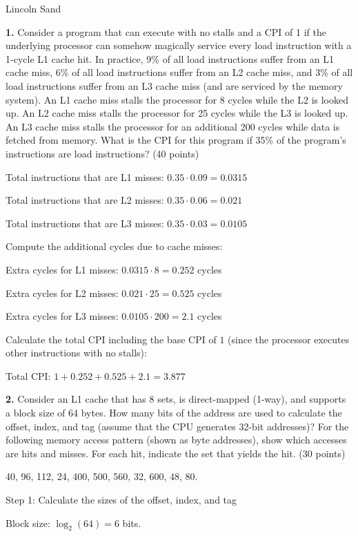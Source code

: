 \documentclass{article}
\begin{document}
\Large{Lincoln Sand}


\textbf{1.}  Consider a program that can execute with no stalls and a CPI of 1
if the underlying processor can somehow magically service every load
instruction with a 1-cycle L1 cache hit. In practice, 9\% of all load
instructions suffer from an L1 cache miss, 6\% of all load instructions
suffer from an L2 cache miss, and 3\% of all load instructions suffer
from an L3 cache miss (and are serviced by the memory system).
An L1 cache miss stalls the processor for 8 cycles while the L2
is looked up. An L2 cache miss stalls the processor for 25 cycles
while the L3 is looked up. An L3 cache miss stalls the processor
for an additional 200 cycles while data is fetched from memory.
What is the CPI for this program if 35\% of the program's instructions
are load instructions? (40 points) 

Total instructions that are L1 misses: $0.35 \cdot 0.09 = 0.0315$

Total instructions that are L2 misses: $0.35 \cdot 0.06 = 0.021$

Total instructions that are L3 misses: $0.35 \cdot 0.03 = 0.0105$

Compute the additional cycles due to cache misses:

Extra cycles for L1 misses: $0.0315 \cdot 8 = 0.252$ cycles

Extra cycles for L2 misses: $0.021 \cdot 25 = 0.525$ cycles

Extra cycles for L3 misses: $0.0105 \cdot 200 = 2.1$ cycles

Calculate the total CPI including the base CPI of $1$ (since
the processor executes other instructions with no stalls):

Total CPI: $1 + 0.252 + 0.525 + 2.1 = 3.877$

\newpage

\textbf{2.} Consider an L1 cache that has 8 sets, is direct-mapped
(1-way), and supports a block size of 64 bytes. How many bits of
the address are used to calculate the offset, index, and tag
(assume that the CPU generates 32-bit addresses)? For the
following memory access pattern (shown as byte addresses),
show which accesses are hits and misses. For each hit,
indicate the set that yields the hit. (30 points) 

40, 96, 112, 24, 400, 500, 560, 32, 600, 48, 80.

Step 1: Calculate the sizes of the offset, index, and tag

Block size: $\log_2(64) = 6$ bits.
\end{document}
